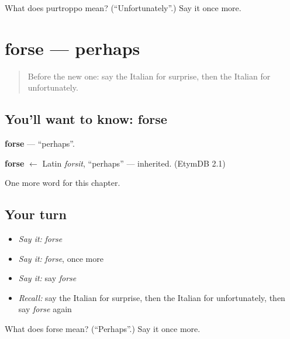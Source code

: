 \begin{tcolorbox}[breakable,colback=teal!4,colframe=teal!35!black,title={Before you move on}]
What does purtroppo mean? (\textquotedblleft{}Unfortunately\textquotedblright{}.) Say it once more.
\end{tcolorbox}
\section[forse]{forse — perhaps}

\label{lesson:IT-C217-forse}



\begin{quote}
Before the new one: say the Italian for surprise, then the Italian for unfortunately.
\end{quote}

\subsection*{You'll want to know: forse}
\textbf{forse} — \textquotedblleft{}perhaps\textquotedblright{}.

\begin{cousinweb}
\textbf{forse} $\leftarrow$ Latin \emph{forsit}, \textquotedblleft{}perhaps\textquotedblright{} — inherited. (EtymDB 2.1)
\end{cousinweb}

\begin{grammarlens}[title={What you've built}]
One more word for this chapter.
\end{grammarlens}

\subsection*{Your turn}
\begin{itemize}
\raggedright
  \item \emph{Say it:} \emph{forse}
  \item \emph{Say it:} \emph{forse}, once more
  \item \emph{Say it:} say \emph{forse}
  \item \emph{Recall:} say the Italian for surprise, then the Italian for unfortunately, then say \emph{forse} again
\end{itemize}

\begin{tcolorbox}[breakable,colback=teal!4,colframe=teal!35!black,title={Before you move on}]
What does forse mean? (\textquotedblleft{}Perhaps\textquotedblright{}.) Say it once more.
\end{tcolorbox}
